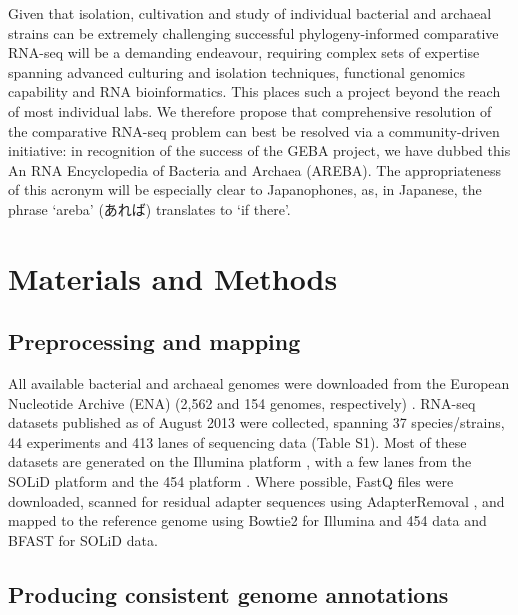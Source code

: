 \documentclass[10pt]{article}
\begin{document}
\begin{CJK}{UTF8}{min}
Given that isolation, cultivation and study of individual bacterial
and archaeal strains can be extremely challenging \cite{Stewart:2012}
successful phylogeny-informed comparative RNA-seq will be a demanding
endeavour, requiring complex sets of expertise spanning advanced
culturing and isolation techniques, functional genomics capability and
RNA bioinformatics. This places such a project beyond the reach of
most individual labs. We therefore propose that comprehensive
resolution of the comparative RNA-seq problem can best be resolved via
a community-driven initiative: in recognition of the success of the
GEBA project, we have dubbed this An RNA Encyclopedia of Bacteria and
Archaea (AREBA). The appropriateness of this acronym will be
especially clear to Japanophones, as, in Japanese, the phrase ‘areba’
(あれば) translates to ‘if there’.
\end{CJK}

\section*{Materials and Methods}

\subsection*{Preprocessing and mapping}

All available bacterial and archaeal genomes were downloaded from the
European Nucleotide Archive (ENA) (2,562 and 154 genomes,
respectively) \cite{Cochrane:2013}. RNA-seq datasets published as of
August 2013 were collected, spanning 37 species/strains, 44 experiments
and 413 lanes of sequencing data (Table S1). Most of these datasets
are generated on the Illumina platform \cite{Shendure:2005}, with a
few lanes from the SOLiD platform \cite{Cloonan:2008} and the 454
platform \cite{Margulies:2005}. Where possible, FastQ files were
downloaded, scanned for residual adapter sequences using
AdapterRemoval \cite{Lindgreen:2012}, and mapped to the reference genome
using Bowtie2 \cite{Langmead:2012} for Illumina and 454 data
and BFAST \cite{Homer:2009} for SOLiD data.

\subsection*{Producing consistent genome annotations}
\end{document}
